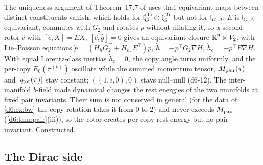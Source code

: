 \begin{remark}
\label{d6:rem:copyrotor}
The uniqueness argument of Theorem~17.7 of \cite{ES17} uses that equivariant maps between distinct constituents vanish, which holds for
$\mathfrak l_G^{(1)}\oplus\mathfrak l_G^{(2)}$ but not for $\mathfrak l_{G,\Delta}$: $E$ is $\mathfrak l_{G,\Delta}$-equivariant, commutes with $G_2$ and rotates $p$ without dilating it, so a
second rotor $\hat c$ with $[\hat c,X]=EX$, $[\hat c,\hat g]=0$ gives an equivariant closure $\mathbb{R}^2\ltimes V_2$, with Lie--Poisson equations
$\dot p=(H_hG_2^{\!\top}+H_{h_c}E^{\!\top})p$, $\dot h=-p^{\!\top}G_2\nabla H$, $\dot h_c=-p^{\!\top}E\nabla H$. With equal Lorentz-class inertias
$\dot h_c=0$, the copy angle turns uniformly, and the per-copy $E_0(\pi^{(k)})$ oscillate while the summed momentum tensor, $M_{\rm pair}(\pi)$ and
$|q_{\rm tot}(\pi)|$ stay constant; $((1,i,0),0)$ stays null--null (d6-12). The inter-manifold $b$-field made dynamical changes
the rest energies of the two manifolds at fixed pair invariants. Their sum is not conserved in general (for the data of \cref{d6:ex:bw} the copy
rotation takes it from $0$ to $2$) and never exceeds $M_{\rm pair}$ (\cref{d6:thm:pair}(iii)), so the rotor creates per-copy rest energy but no
pair invariant. Constructed.
\end{remark}

\subsection{The Dirac side}
\label{d6:sec:dirac}

